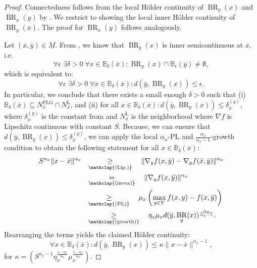 \documentclass{article}
\newcommand{\B}{\mathbb{B}}
\DeclareMathOperator{\BR}{BR}
\begin{document}
\begin{proof}
     Connectedness follows from the local Hölder continuity of $\BR_y(x)$ and $\BR_x(y)$ by . We restrict to showing the local inner Hölder continuity of $\BR_y(x)$. The proof for $\BR_x(y)$ follows analogously.
     
     Let $(\overline{x},\overline{y})\in \underline{M}$. From , we know that $\BR_y(x)$ is inner semicontinuous at $\overline{x}$, i.e.
     \[
     \forall \epsilon\; \exists \delta>0\; \forall x\in \B_{\delta}(\overline{x}): \BR_y(x)\cap \B_{\epsilon}(\overline{y})\neq \emptyset,
     \]
     which is equivalent to:
        \[
        \forall \epsilon\; \exists \delta>0\; \forall x\in \B_{\delta}(\overline{x}): d(\overline{y},\BR_y(x))\leq \epsilon.
        \]
    In particular, we conclude that there exists a small enough $\delta>0$ such that (i) $\B_\delta(\overline{x})\subseteq N_{\overline{x}}^\text{PLG}\cap N_{\overline{x}}^\text{L}$, and (ii) for all $ x\in \B_{\delta}(\overline{x}): d(\overline{y},\BR_y(x))\leq \delta_{\overline{x}}^{(y)}$, where $\delta_{\overline{x}}^{(y)}$ is the constant from  and $N_{\overline{x}}^\text{L}$ is the neighborhood where $\nabla f$ is Lipschitz continuous with constant $S$. Because, we can ensure that $d(\overline{y},\BR_y(x))\leq  \delta_{\overline{x}}^{(y)} $, we can apply the local $\alpha_x$-PL and $\frac{\alpha_x}{\alpha_x-1}$-growth condition to obtain the following statement for all $x\in \B_{\delta}(\overline{x})$:
    \begin{align*}
        S^{\alpha_x}\|x - \bar{x}\|^{\alpha_x} \ \ &\underset{\mathclap{\text{(Lip.)}}}{\geq}\ \  \ \|\nabla_y f(x,\bar{y}) - \nabla_y f(\bar{x},\bar{y})\|^{\alpha_x}\\
        &\underset{\mathclap{\text{(invex)}}}{=} \ \ \ \|\nabla_y f(x,\bar{y})\|^{\alpha_x}\\
        &\underset{\mathclap{\text{(PL)}}}{\geq}  \ \ \  \mu_{x} \left(\max_{y \in Y} f(x,y) - f(x,\bar{y})\right)\\
        &\underset{\mathclap{\text{(growth)}}}{\geq} \ \  \ \eta_x \mu_{x} d(\bar{y}, \BR_y(x))^{\frac{\alpha_x}{\alpha_x-1}}.
    \end{align*}
    Rearranging the terms yields the claimed Hölder continuity: 
    \[
    \forall x \in \B_{\delta}(\overline{x}): d(\overline{y},\BR_y(x)) \leq \kappa \|x-\overline{x}\|^{\alpha_x-1},
    \]
    for $\kappa = \left(S^{\alpha_x-1} \eta_x^{\frac{1-\alpha_x}{\alpha_x}}\mu_x^{\frac{1-\alpha_x}{\alpha_x}}\right)$.
\end{proof}
\end{document}

